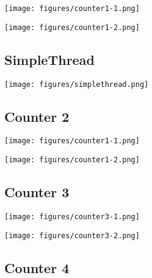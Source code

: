 \documentclass[12pt]{article}
\begin{document}
\begin{center}
  \texttt{[image: figures/counter1-1.png]}
\end{center}

\begin{center}
  \texttt{[image: figures/counter1-2.png]}
\end{center}

\subsection*{SimpleThread}

\begin{center}
  \texttt{[image: figures/simplethread.png]}
\end{center}

\subsection*{Counter 2}

\begin{center}
  \texttt{[image: figures/counter1-1.png]}
\end{center}

\begin{center}
  \texttt{[image: figures/counter1-2.png]}
\end{center}

\subsection*{Counter 3}

\begin{center}
  \texttt{[image: figures/counter3-1.png]}
\end{center}

\begin{center}
  \texttt{[image: figures/counter3-2.png]}
\end{center}

\subsection*{Counter 4}
\end{document}
